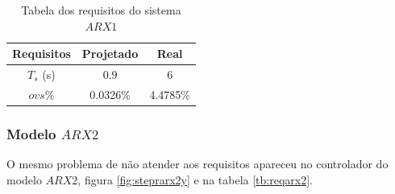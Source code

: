 \begin{table}[htb]
	\centering
	\begin{tabular}{|c|c|c|}
		\hline 
		Requisitos & Projetado & Real \\ 
		\hline 
		$T_s$ (s) & 0.9 & 6 \\ 
		\hline 
		$ovs\%$ & 0.0326\% & 4.4785\% \\ 
		\hline 
	\end{tabular} 
	\caption{Tabela dos requisitos do sistema $ARX1$}
	\label{tb:reqarx1}
\end{table}

\subsubsection{Modelo $ARX2$}
O mesmo problema de não atender aos requisitos apareceu no controlador do modelo $ARX2$, figura \ref{fig:steprarx2y} e na tabela \ref{tb:reqarx2}.

